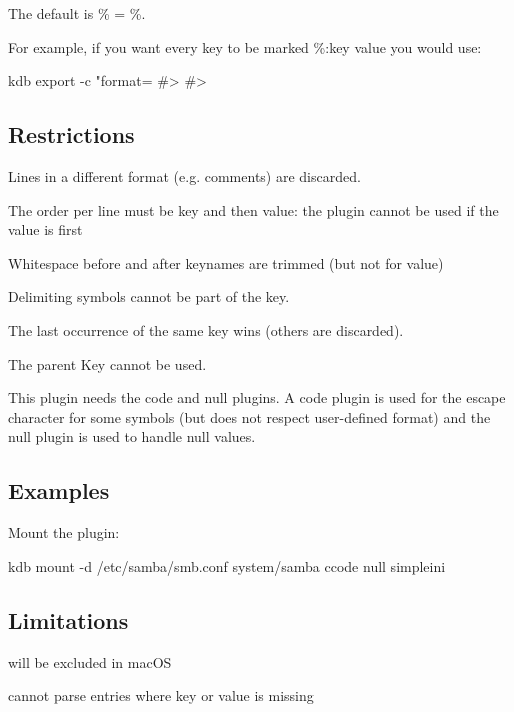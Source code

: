 The default is {\ttfamily \% = \%}.

For example, if you want every key to be marked {\ttfamily \%\+:key value} you would use\+:


\begin{DoxyCode}
kdb export -c "format=%
#> %
#> %
\end{DoxyCode}


\subsection*{Restrictions}


\begin{DoxyItemize}
\item Lines in a different format (e.\+g. comments) are discarded.
\item The order per line must be key and then value\+: the plugin cannot be used if the value is first
\item Whitespace before and after keynames are trimmed (but not for value)
\item Delimiting symbols cannot be part of the key.
\item The last occurrence of the same key wins (others are discarded).
\item The parent Key cannot be used.
\item This plugin needs the code and null plugins. A code plugin is used for the escape character for some symbols (but does not respect user-\/defined {\ttfamily format}) and the null plugin is used to handle null values.
\end{DoxyItemize}

\subsection*{Examples}

Mount the plugin\+:


\begin{DoxyCode}
kdb mount -d /etc/samba/smb.conf system/samba ccode null simpleini
\end{DoxyCode}


\subsection*{Limitations}


\begin{DoxyItemize}
\item will be excluded in mac\+OS
\item cannot parse entries where key or value is missing 
\end{DoxyItemize}